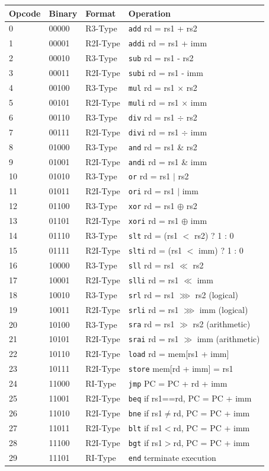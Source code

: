 \documentclass[12pt,a4paper]{article}
\begin{document}
\begin{longtable}{p{1.5cm}p{2cm}p{2cm}p{7cm}}
\toprule
\textbf{Opcode} & \textbf{Binary} & \textbf{Format} & \textbf{Operation} \\
\midrule
0 & 00000 & R3-Type & \texttt{add} rd = rs1 + rs2 \\
1 & 00001 & R2I-Type & \texttt{addi} rd = rs1 + imm \\
2 & 00010 & R3-Type & \texttt{sub} rd = rs1 - rs2 \\
3 & 00011 & R2I-Type & \texttt{subi} rd = rs1 - imm \\
4 & 00100 & R3-Type & \texttt{mul} rd = rs1 $\times$ rs2 \\
5 & 00101 & R2I-Type & \texttt{muli} rd = rs1 $\times$ imm \\
6 & 00110 & R3-Type & \texttt{div} rd = rs1 $\div$ rs2 \\
7 & 00111 & R2I-Type & \texttt{divi} rd = rs1 $\div$ imm \\
8 & 01000 & R3-Type & \texttt{and} rd = rs1 \& rs2 \\
9 & 01001 & R2I-Type & \texttt{andi} rd = rs1 \& imm \\
10 & 01010 & R3-Type & \texttt{or} rd = rs1 $|$ rs2 \\
11 & 01011 & R2I-Type & \texttt{ori} rd = rs1 $|$ imm \\
12 & 01100 & R3-Type & \texttt{xor} rd = rs1 $\oplus$ rs2 \\
13 & 01101 & R2I-Type & \texttt{xori} rd = rs1 $\oplus$ imm \\
14 & 01110 & R3-Type & \texttt{slt} rd = (rs1 $<$ rs2) ? 1 : 0 \\
15 & 01111 & R2I-Type & \texttt{slti} rd = (rs1 $<$ imm) ? 1 : 0 \\
16 & 10000 & R3-Type & \texttt{sll} rd = rs1 $\ll$ rs2 \\
17 & 10001 & R2I-Type & \texttt{slli} rd = rs1 $\ll$ imm \\
18 & 10010 & R3-Type & \texttt{srl} rd = rs1 $\ggg$ rs2 (logical) \\
19 & 10011 & R2I-Type & \texttt{srli} rd = rs1 $\ggg$ imm (logical) \\
20 & 10100 & R3-Type & \texttt{sra} rd = rs1 $\gg$ rs2 (arithmetic) \\
21 & 10101 & R2I-Type & \texttt{srai} rd = rs1 $\gg$ imm (arithmetic) \\
22 & 10110 & R2I-Type & \texttt{load} rd = mem[rs1 + imm] \\
23 & 10111 & R2I-Type & \texttt{store} mem[rd + imm] = rs1 \\
24 & 11000 & RI-Type & \texttt{jmp} PC = PC + rd + imm \\
25 & 11001 & R2I-Type & \texttt{beq} if rs1==rd, PC = PC + imm \\
26 & 11010 & R2I-Type & \texttt{bne} if rs1$\neq$rd, PC = PC + imm \\
27 & 11011 & R2I-Type & \texttt{blt} if rs1$<$rd, PC = PC + imm \\
28 & 11100 & R2I-Type & \texttt{bgt} if rs1$>$rd, PC = PC + imm \\
29 & 11101 & RI-Type & \texttt{end} terminate execution \\
\bottomrule
\end{longtable}
\end{document}
